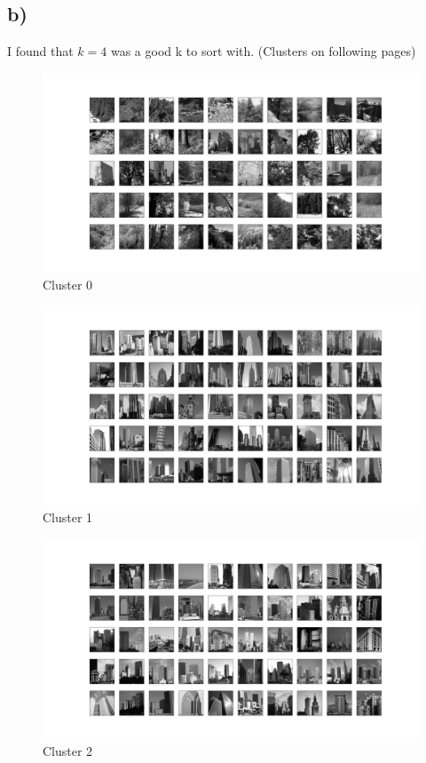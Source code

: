 \documentclass{article}
\begin{document}
        \subsection*{b)}
        \qquad I found that $k=4$ was a good k to sort with.
        (Clusters on following pages)
        \begin{figure}[h]
            \centering
            \includegraphics[width=\textwidth]{"k_4_0.png"}
            \caption{Cluster 0}
        \end{figure}  
        \begin{figure}[!h]
            \centering
            \includegraphics[width=\textwidth]{"k_4_1.png"}
            \caption{Cluster 1}
        \end{figure}  
        \begin{figure}[!h]
            \centering
            \includegraphics[width=\textwidth]{"k_4_2.png"}
            \caption{Cluster 2}
        \end{figure}  
\end{document}
